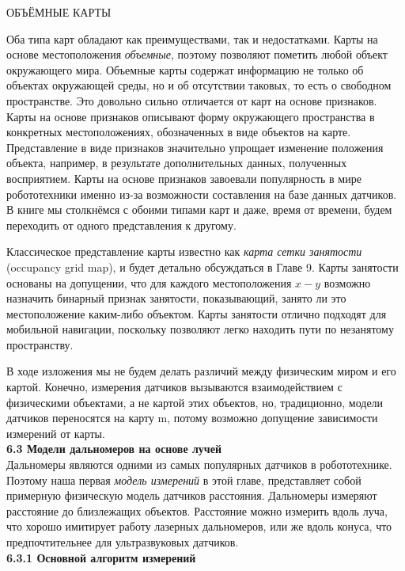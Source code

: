 \documentclass[10pt,a4paper]{article}
\begin{document}
ОБЪЁМНЫЕ КАРТЫ
 
Оба типа карт обладают как преимуществами, так и недостатками. Карты на основе местоположения
\textit{объемные}, поэтому позволяют пометить любой объект окружающего мира.
Объемные карты содержат информацию не только об объектах окружающей среды, но и об отсутствии таковых, то есть о свободном пространстве. Это довольно сильно отличается от карт на основе признаков. Карты на основе признаков описывают форму окружающего пространства в конкретных местоположениях, обозначенных в виде объектов на карте. Представление в виде признаков значительно упрощает изменение положения объекта, например, в результате дополнительных данных, полученных восприятием. Карты на основе признаков завоевали популярность в мире робототехники именно из-за возможности составления на базе данных датчиков. В книге мы столкнёмся с обоими типами карт и даже, время от времени, будем переходить от одного представления к другому. 

Классическое представление карты известно как \textit{карта сетки занятости} (occupancy grid map), и будет детально обсуждаться в Главе 9. Карты занятости основаны на допущении, что для каждого местоположения $x-y$ возможно назначить бинарный признак занятости, показывающий, занято ли это местоположение каким-либо объектом. Карты занятости отлично подходят для мобильной навигации, поскольку позволяют легко находить пути по незанятому пространству. 

В ходе изложения мы не будем делать различий между физическим миром и его картой. Конечно, измерения датчиков вызываются взаимодействием с физическими объектами, а не картой этих объектов, но, традиционно, модели датчиков переносятся на карту m, потому возможно допущение зависимости измерений от карты. \\

\textbf{6.3 Модели дальномеров на основе лучей}\\

Дальномеры являются одними из самых популярных датчиков в робототехнике. Поэтому наша первая \textit{модель измерений} в этой главе, представляет собой примерную физическую модель датчиков расстояния. Дальномеры измеряют расстояние до близлежащих объектов. Расстояние можно измерить вдоль луча, что хорошо имитирует работу лазерных дальномеров, или же вдоль конуса, что предпочтительнее для ультразвуковых датчиков.\\

\textbf{6.3.1 Основной алгоритм измерений}\\
\end{document}
